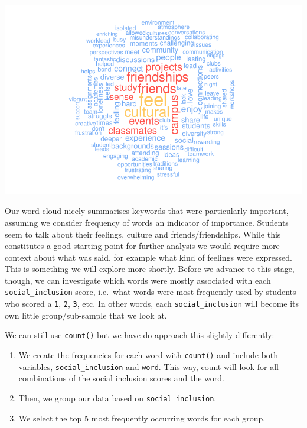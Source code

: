 \documentclass[
  letterpaper,
  DIV=11,
  numbers=noendperiod]{scrreprt}
\begin{document}
\includegraphics{14_mixed_methods_files/figure-pdf/wordcloud-plain-1.pdf}

Our word cloud nicely summarises keywords that were particularly
important, assuming we consider frequency of words an indicator of
importance. Students seem to talk about their feelings, culture and
friends/friendships. While this constitutes a good starting point for
further analysis we would require more context about what was said, for
example what kind of feelings were expressed. This is something we will
explore more shortly. Before we advance to this stage, though, we can
investigate which words were mostly associated with each
\texttt{social\_inclusion} score, i.e.~what words were most frequently
used by students who scored a \texttt{1}, \texttt{2}, \texttt{3}, etc.
In other words, each \texttt{social\_inclusion} will become its own
little group/sub-sample that we look at.

We can still use \texttt{count()} but we have do approach this slightly
differently:

\begin{enumerate}
\def\labelenumi{\arabic{enumi}.}
\item
  We create the frequencies for each word with \texttt{count()} and
  include both variables, \texttt{social\_inclusion} and \texttt{word}.
  This way, count will look for all combinations of the social inclusion
  scores and the word.
\item
  Then, we group our data based on \texttt{social\_inclusion}.
\item
  We select the top 5 most frequently occurring words for each group.
\end{enumerate}
\end{document}

